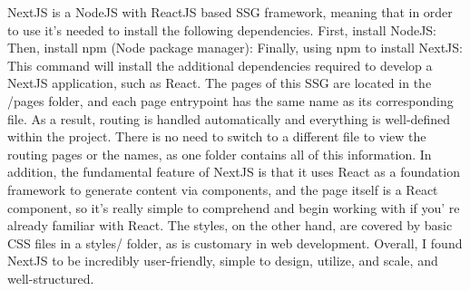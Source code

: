 \markdownRendererDocumentBegin
NextJS is a NodeJS with ReactJS based SSG framework, meaning that in order to use it's needed to install the following dependencies.\markdownRendererInterblockSeparator
{}\markdownRendererOlBeginTight
{}First, install NodeJS: \markdownRendererOlItemEnd 
{}Then, install npm (Node package manager): \markdownRendererOlItemEnd 
{}Finally, using npm to install NextJS: \markdownRendererOlItemEnd 
\markdownRendererOlEndTight \markdownRendererInterblockSeparator
{}This command will install the additional dependencies required to develop a NextJS application, such as React. The pages of this SSG are located in the /pages folder, and each page entrypoint has the same name as its corresponding file. As a result, routing is handled automatically and everything is well-defined within the project.\markdownRendererInterblockSeparator
{}There is no need to switch to a different file to view the routing pages or the names, as one folder contains all of this information.\markdownRendererInterblockSeparator
{}In addition, the fundamental feature of NextJS is that it uses React as a foundation framework to generate content via components, and the page itself is a React component, so it's really simple to comprehend and begin working with if you' re already familiar with React.\markdownRendererInterblockSeparator
{}The styles, on the other hand, are covered by basic CSS files in a styles/ folder, as is customary in web development.\markdownRendererInterblockSeparator
{}Overall, I found NextJS to be incredibly user-friendly, simple to design, utilize, and scale, and well-structured.\markdownRendererDocumentEnd